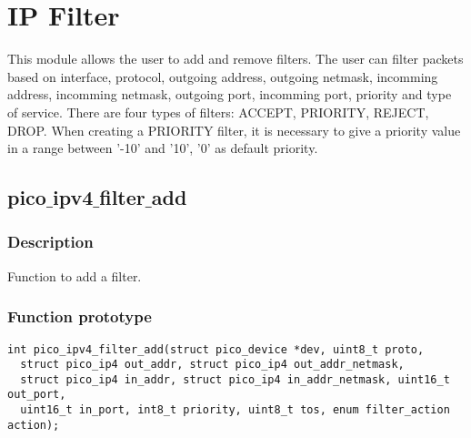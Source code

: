 \section{IP Filter}

This module allows the user to add and remove filters. The user can filter packets based on interface, protocol, outgoing address, outgoing netmask, incomming address, incomming netmask, outgoing port, incomming port, priority and type of service. There are four types of filters: ACCEPT, PRIORITY, REJECT, DROP. When creating a PRIORITY filter, it is necessary to give a priority value in a range between '-10' and '10', '0' as default priority.


\subsection{pico$\_$ipv4$\_$filter$\_$add}

\subsubsection*{Description}
Function to add a filter.

\subsubsection*{Function prototype}
\begin{verbatim}
int pico_ipv4_filter_add(struct pico_device *dev, uint8_t proto,
  struct pico_ip4 out_addr, struct pico_ip4 out_addr_netmask,
  struct pico_ip4 in_addr, struct pico_ip4 in_addr_netmask, uint16_t out_port,
  uint16_t in_port, int8_t priority, uint8_t tos, enum filter_action action);
\end{verbatim}

